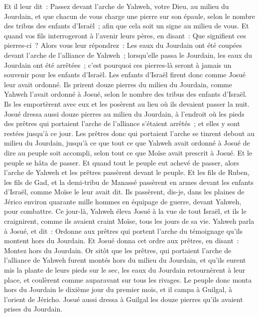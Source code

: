 \begin{multicols}{2}
Et il leur dit~: Passez devant l'arche de Yahweh, votre Dieu, au milieu du Jourdain, et que chacun de vous charge une pierre sur son épaule, selon le nombre des tribus des enfants d'Israël~;
afin que cela soit un signe au milieu de vous. Et quand vos fils interrogeront à l'avenir leurs pères, en disant~: Que signifient ces pierres-ci~?
Alors vous leur répondrez~: Les eaux du Jourdain ont été coupées devant l'arche de l'alliance de Yahweh~; lorsqu'elle passa le Jourdain, les eaux du Jourdain ont été arrêtées~; c'est pourquoi ces pierres-là seront à jamais un souvenir pour les enfants d'Israël.
Les enfants d'Israël firent donc comme Josué leur avait ordonné. Ils prirent douze pierres du milieu du Jourdain, comme Yahweh l'avait ordonné à Josué, selon le nombre des tribus des enfants d'Israël. Ils les emportèrent avec eux et les posèrent au lieu où ils devaient passer la nuit.
Josué dressa aussi douze pierres au milieu du Jourdain, à l'endroit où les pieds des prêtres qui portaient l'arche de l'alliance s'étaient arrêtés~; et elles y sont restées jusqu'à ce jour.
Les prêtres donc qui portaient l'arche se tinrent debout au milieu du Jourdain, jusqu'à ce que tout ce que Yahweh avait ordonné à Josué de dire au peuple soit accompli, selon tout ce que Moïse avait prescrit à Josué. Et le peuple se hâta de passer.
Et quand tout le peuple eut achevé de passer, alors l'arche de Yahweh et les prêtres passèrent devant le peuple.
Et les fils de Ruben, les fils de Gad, et la demi-tribu de Manassé passèrent en armes devant les enfants d'Israël, comme Moïse le leur avait dit.
Ils passèrent, dis-je, dans les plaines de Jérico environ quarante mille hommes en équipage de guerre, devant Yahweh, pour combattre. 
Ce jour-là, Yahweh éleva Josué à la vue de tout Israël, et ils le craignirent, comme ils avaient craint Moïse, tous les jours de sa vie.
Yahweh parla à Josué, et dit~:
Ordonne aux prêtres qui portent l'arche du témoignage qu'ils montent hors du Jourdain.
Et Josué donna cet ordre aux prêtres, en disant~: Montez hors du Jourdain.
Or sitôt que les prêtres, qui portaient l'arche de l'alliance de Yahweh furent montés hors du milieu du Jourdain, et qu'ils eurent mis la plante de leurs pieds sur le sec, les eaux du Jourdain retournèrent à leur place, et coulèrent comme auparavant sur tous les rivages.
Le peuple donc monta hors du Jourdain le dixième jour du premier mois, et il campa à Guilgal, à l'orient de Jéricho.
Josué aussi dressa à Guilgal les douze pierres qu'ils avaient prises du Jourdain.

\end{multicols}
